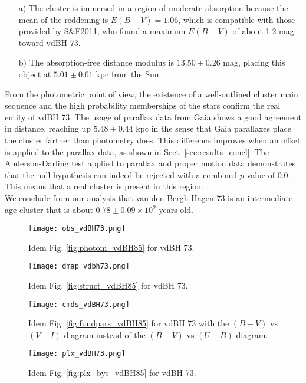 \documentclass[draft]{aa}
\begin{document}
\begin{itemize}
\item [a)] The cluster is immersed in a region of moderate absorption
because the mean of the reddening is $E(B-V)=1.06$, which is compatible
with those provided by S\&F2011, who found a maximum $E(B-V)$ of about 1.2 mag
toward vdBH 73.
\item [b)] The absorption-free distance modulus is
$13.50\pm0.26$ mag, placing this object at $5.01\pm0.61$ kpc from the Sun.
\end{itemize}

From the photometric point of view, the existence of a well-outlined cluster main
sequence and the high probability memberships of the stars confirm
the real entity of vdBH 73.
The usage of parallax data from Gaia shows a good agreement in distance,
reaching up $5.48\pm0.44$ kpc in the sense that Gaia parallaxes place the
cluster farther than photometry does. This difference improves when an offset is
applied to the parallax data, as shown in Sect. \ref{sec:results_concl}.
The Anderson-Darling test applied to parallax and proper motion data
demonstrates that the null hypothesis can indeed be rejected with a
combined $p$-value of 0.0. This means that a real cluster is present in this
region.\\

We conclude from our analysis that van den Bergh-Hagen 73 is an intermediate-age cluster that is about $0.78\pm0.09\times10^9$ years old.


\begin{figure*}[ht]
    \centering
    \texttt{[image: obs\_vdBH73.png]}
\caption{Idem Fig. \ref{fig:photom_vdBH85} for vdBH 73.}
    \label{fig:photom_vdBH73}
\end{figure*}

\begin{figure*}[ht]
    \centering
    \texttt{[image: dmap\_vdbh73.png]}
\caption{Idem Fig. \ref{fig:struct_vdBH85} for vdBH 73.}
    \label{fig:struct_vdBH73}
\end{figure*}

\begin{figure*}[ht]
    \centering
    \texttt{[image: cmds\_vdBH73.png]}
\caption{Idem Fig. \ref{fig:fundpars_vdBH85} for vdBH 73 with the $(B-V)$ vs
$(V-I)$ diagram instead of the $(B-V)$ vs $(U-B)$ diagram.}
    \label{fig:fundpars_vdBH73}
\end{figure*}

\begin{figure*}[ht]
    \centering
    \texttt{[image: plx\_vdBH73.png]}
\caption{Idem Fig. \ref{fig:plx_bys_vdBH85} for vdBH 73.}
\label{fig:plx_bys_vdBH73}
\end{figure*}
\end{document}
